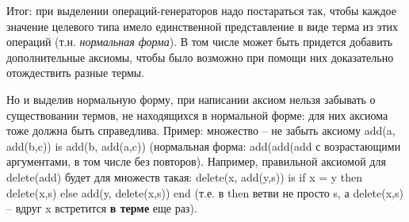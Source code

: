 Итог: при выделении операций-генераторов надо постараться так, чтобы каждое значение целевого типа имело единственной представление в виде терма из этих операций (т.н. \emph{нормальная форма}). В том числе может быть придется добавить дополнительные аксиомы, чтобы было возможно при помощи них доказательно отождествить разные термы.

Но и выделив нормальную форму, при написании аксиом нельзя забывать о существовании термов, не находящихся в нормальной форме: для них аксиома тоже должна быть справедлива. Пример: множество -- не забыть аксиому add(a, add(b,c)) is add(b, add(a,c))   (нормальная форма: add(add(add с возрастающими аргументами, в том числе без повторов). Например, правильной аксиомой для delete(add) будет для множеств такая: delete(x, add(y,s)) is if x = y then delete(x,s) else add(y, delete(x,s)) end (т.е. в then ветви не просто s, а delete(x,s) -- вдруг x встретится \textbf{в терме} еще раз).

